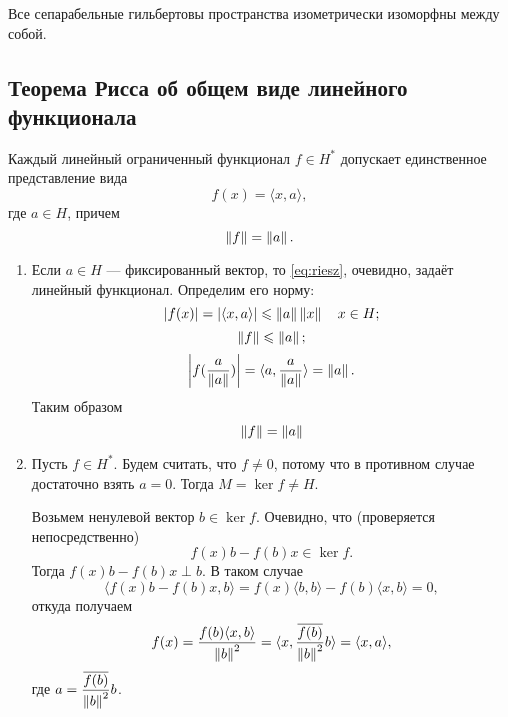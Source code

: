 \begin{corollaryth}
    Все сепарабельные гильбертовы пространства изометрически изоморфны между собой.
\end{corollaryth}

\subsection[Теорема Рисса]{Теорема Рисса об общем виде линейного\\функционала}
\begin{theorem}
    Каждый линейный ограниченный функционал $f \in H^*$ допускает единственное 
    представление вида
    \begin{equation}\label{eq:riesz}
        f(x) = \langle x, a \rangle,
    \end{equation}
    где $a \in H$, причем
    \[ \left\|f\right\| = \left\|a\right\|. \]
\end{theorem}

\begin{proofbreak}
\begin{enumerate}
    \item Если $a \in H$ --- фиксированный вектор, то \eqref{eq:riesz}, очевидно, задаёт линейный
        функционал. Определим его норму:
            \[ \left|f(x)\right| = \left|\langle x, a \rangle\right| \leqslant \left\|a\right\|\left\|x\right\| \quad x \in H; \]
            \[ \left\|f\right\| \leqslant \left\|a\right\|; \]
            \[ \left|f(\frac{a}{\left\|a\right\|})\right| = \langle a, \frac{a}{\left\|a\right\|} \rangle = \left\|a\right\|. \]
        Таким образом
        \[ \left\|f\right\| = \left\|a\right\| \]
    \item Пусть $f \in H^*$. Будем считать, что $f \neq 0$, потому что в противном случае
        достаточно взять $a = 0$. Тогда $M = \ker f \neq H$.

        Возьмем ненулевой вектор $b \in \ker f$. Очевидно, что (проверяется непосредственно)
        \[ f(x)b - f(b)x \in \ker f. \]
        Тогда $f(x)b - f(b)x \perp b$. В таком случае
        \[ \langle f(x)b - f(b) x, b \rangle = f(x) \langle b, b \rangle - 
            f(b) \langle x, b \rangle = 0, \]
        откуда получаем
        \[ f(x) = \frac{f(b)\langle x, b \rangle}{\left\|b\right\|^2} 
            = \langle x, \frac{\overline{f(b)}}{\left\|b\right\|^2}b \rangle = \langle x, a \rangle, \]
        где $a = \displaystyle\frac{\overline{f(b)}}{\left\|b\right\|^2}b$.
\end{enumerate}
\end{proofbreak}
